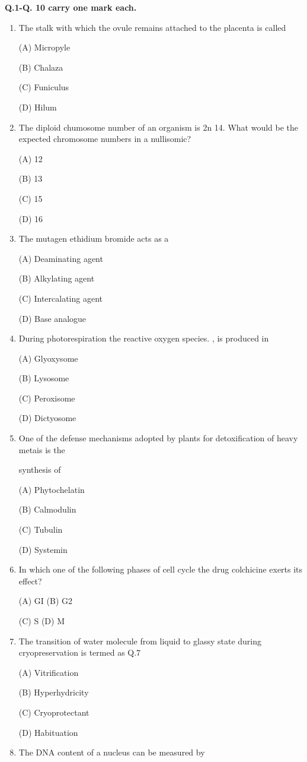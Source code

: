 \documentclass[journal]{IEEEtran}
\begin{document}
\textbf{Q.1-Q. 10 carry one mark each.}
\begin{enumerate}
\item {The stalk with which the ovule remains attached to the placenta is called

(A) Micropyle

(B) Chalaza

(C) Funiculus

(D) Hilum
}
\item {The diploid chumosome number of an organism is 2n 14. What would be the expected chromosome numbers in a nullisomic?

(A) 12

(B) 13

(C) 15

(D) 16
}
\item {The mutagen ethidium bromide acts as a

(A) Deaminating agent

(B) Alkylating agent

(C) Intercalating agent

(D) Base analogue
}
\item{During photorespiration the reactive oxygen species. , is produced in

(A) Glyoxysome

(B) Lysosome

(C) Peroxisome

(D) Dictyosome
}
\item{ One of the defense mechanisms adopted by plants for detoxification of heavy metais is the

synthesis of

(A) Phytochelatin

(B) Calmodulin

(C) Tubulin

(D) Systemin
}
\item {In which one of the following phases of cell cycle the drug colchicine exerts its effect?


(A) GI
(B) G2

(C) S
(D) M
}
\item {The transition of water molecule from liquid to glassy state during cryopreservation is termed as Q.7

(A) Vitrification

(B) Hyperhydricity

(C) Cryoprotectant

(D) Habituation
}

\item {The DNA content of a nucleus can be measured by

}
\end{enumerate}
\end{document}
